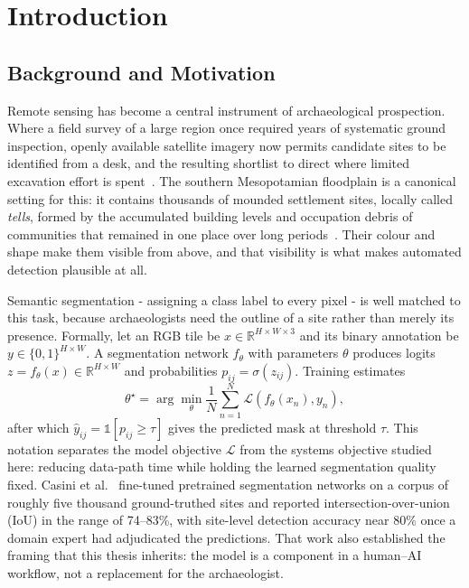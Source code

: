 \section{Introduction}
\label{ch:introduction}

\subsection{Background and Motivation}

Remote sensing has become a central instrument of archaeological prospection.
Where a field survey of a large region once required years of systematic ground
inspection, openly available satellite imagery now permits candidate sites to be
identified from a desk, and the resulting shortlist to direct where limited
excavation effort is spent~\cite{Casini23,Orengo20}.
The southern Mesopotamian floodplain is a canonical setting for this: it contains
thousands of mounded settlement sites, locally called \emph{tells}, formed by the
accumulated building levels and occupation debris of communities that remained in
one place over long periods~\cite{Wilkinson03}.
Their colour and shape make them visible from above, and that visibility is what
makes automated detection plausible at all.

Semantic segmentation - assigning a class label to every pixel - is well matched
to this task, because archaeologists need the outline of a site rather than merely
its presence.
Formally, let an RGB tile be $x\in\mathbb{R}^{H\times W\times 3}$ and its binary
annotation be $y\in\{0,1\}^{H\times W}$.  A segmentation network
$f_{\theta}$ with parameters $\theta$ produces logits
$z=f_{\theta}(x)\in\mathbb{R}^{H\times W}$ and probabilities
$p_{ij}=\sigma(z_{ij})$.  Training estimates
\begin{equation}
  \theta^{\star}=\arg\min_{\theta}\frac{1}{N}
  \sum_{n=1}^{N}\mathcal{L}\!\left(f_{\theta}(x_n),y_n\right),
  \label{eq:seg-objective}
\end{equation}
after which $\hat y_{ij}=\mathbb{1}[p_{ij}\ge\tau]$ gives the predicted mask at
threshold $\tau$.  This notation separates the model objective
$\mathcal{L}$ from the systems objective studied here: reducing data-path time
while holding the learned segmentation quality fixed.
Casini et al.~\cite{Casini23} fine-tuned pretrained segmentation networks on a corpus
of roughly five thousand ground-truthed sites and reported intersection-over-union
(IoU) in the range of 74--83\%, with site-level detection accuracy near 80\% once a
domain expert had adjudicated the predictions.
That work also established the framing that this thesis inherits: the model is a
component in a human--AI workflow, not a replacement for the archaeologist.

